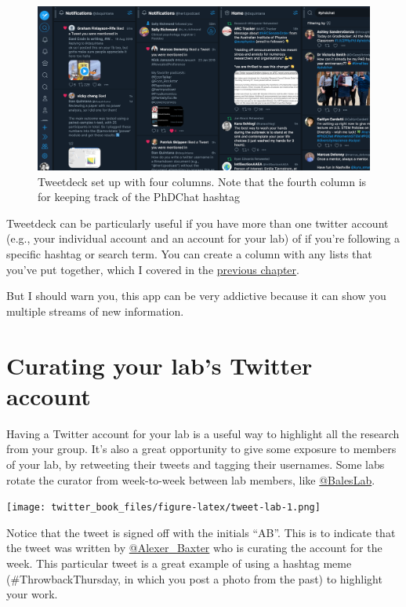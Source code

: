 \documentclass[
]{book}
\begin{document}
\begin{figure}

\includegraphics[width=0.8\linewidth]{images/tweetdeck} \hfill{}

\caption{Tweetdeck set up with four columns. Note that the fourth column is for keeping track of the PhDChat hashtag}\label{fig:unnamed-chunk-15}
\end{figure}

Tweetdeck can be particularly useful if you have more than one twitter account (e.g., your individual account and an account for your lab) of if you're following a specific hashtag or search term. You can create a column with any lists that you've put together, which I covered in the \protect\hyperlink{intermediate}{previous chapter}.

But I should warn you, this app can be very addictive because it can show you multiple streams of new information.

\hypertarget{curating-your-labs-twitter-account}{%
\section*{Curating your lab's Twitter account}\label{curating-your-labs-twitter-account}}

Having a Twitter account for your lab is a useful way to highlight all the research from your group. It's also a great opportunity to give some exposure to members of your lab, by retweeting their tweets and tagging their usernames. Some labs rotate the curator from week-to-week between lab members, like \href{https://twitter.com/BalesLab}{@BalesLab}.

\texttt{[image: twitter\_book\_files/figure-latex/tweet-lab-1.png]}

Notice that the tweet is signed off with the initials ``AB''. This is to indicate that the tweet was written by \href{https://twitter.com/Alexer_Baxter}{@Alexer\_Baxter} who is curating the account for the week. This particular tweet is a great example of using a hashtag meme (\#ThrowbackThursday, in which you post a photo from the past) to highlight your work.
\end{document}
